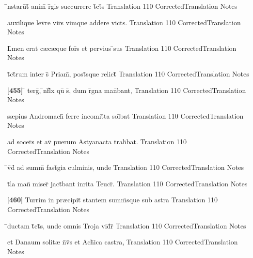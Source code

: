 \latline
  {\={}nstaru\={}t\={\macron {\i}} anim\={\macron {\i}} r\={}gis succurrere t\={}ct\={\macron {\i}}s}
  { Translation }
  {110}
  { CorrectedTranslation }
  { Notes }


\latline
  {auxili\={}que lev\={}re vir\={}s vimque addere vict\={\macron {\i}}s.}
  { Translation }
  {110}
  { CorrectedTranslation }
  { Notes }


\latline
  {L\={\macron {\i}}men erat c{\ae}c{\ae}que for\={}s et pervius \={}sus}
  { Translation }
  {110}
  { CorrectedTranslation }
  { Notes }


\latline
  {t\={}ct\={}rum inter s\={} Priam\={\macron {\i}}, post\={}sque relict\={\macron {\i}}}
  { Translation }
  {110}
  { CorrectedTranslation }
  { Notes }


\latline
  {[\textbf{455}] \={} terg\={}, \={\macron {\i}}nf\={}l\={\macron {\i}}x qu\={} s\={}, dum r\={}gna man\={}bant,}
  { Translation }
  {110}
  { CorrectedTranslation }
  { Notes }


\latline
  {s{\ae}pius Andromach\={} ferre incomit\={}ta sol\={}bat}
  { Translation }
  {110}
  { CorrectedTranslation }
  { Notes }


\latline
  {ad socer\={}s et av\={} puerum Astyanacta trah\={}bat.}
  { Translation }
  {110}
  { CorrectedTranslation }
  { Notes }


\latline
  {\={}v\={}d\={} ad summ\={\macron {\i}} fast\={\macron {\i}}gia culminis, unde}
  { Translation }
  {110}
  { CorrectedTranslation }
  { Notes }


\latline
  {t\={}la man\={} miser\={\macron {\i}} jact\={}bant inrita Teucr\={\macron {\i}}.}
  { Translation }
  {110}
  { CorrectedTranslation }
  { Notes }


\latline
  {[\textbf{460}] Turrim in pr{\ae}cipit\={\macron {\i}} stantem summ\={\macron {\i}}sque sub astra }
  { Translation }
  {110}
  { CorrectedTranslation }
  { Notes }


\latline
  {\={}ductam t\={}ct\={\macron {\i}}s, unde omnis Troja vid\={}r\={\macron {\i}}}
  { Translation }
  {110}
  { CorrectedTranslation }
  { Notes }


\latline
  {et Danaum solit{\ae} n\={}v\={}s et Ach\={}ica castra,}
  { Translation }
  {110}
  { CorrectedTranslation }
  { Notes }


